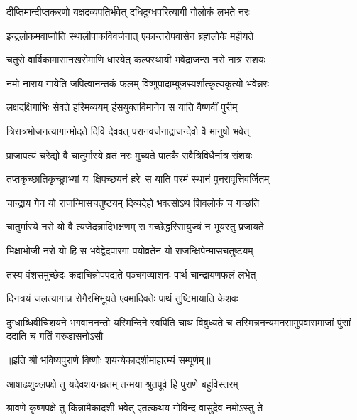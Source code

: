\twolineshloka
{दीप्तिमान्दीप्तकरणो यक्षद्रव्यपतिर्भवेत्}
{दधिदुग्धपरित्यागी गोलोकं लभते नरः} %

\twolineshloka
{इन्द्रलोकमवाप्नोति स्थालीपाकविवर्जनात्}
{एकान्तरोपवासेन ब्रह्मलोके महीयते} %

\twolineshloka
{चतुरो वार्षिकामासानखरोमाणि धारयेत्}
{कल्पस्थायी भवेद्राजन्स नरो नात्र संशयः} %

\twolineshloka
{नमो नाराय गायेति जपित्वानन्तकं फलम्}
{विष्णुपादाम्बुजस्पर्शात्कृत्यकृत्यो भवेन्नरः} %

\twolineshloka
{लक्षदक्षिगाभिः सेवते हरिमव्ययम्}
{हंसयुक्तविमानेन स याति वैष्णवीं पुरीम्} %

\twolineshloka
{त्रिरात्रभोजनत्यागान्मोदते दिवि देववत्}
{परानवर्जनाद्राजन्देवो वै मानुषो भवेत्} %

\twolineshloka
{प्राजापत्यं चरेद्यो वै चातुर्मास्ये व्रतं नरः}
{मुच्यते पातकै सवैत्रिविधैर्नात्र संशयः} %

\twolineshloka
{तप्तकृच्छातिकृच्छ्राभ्यां यः क्षिपच्छयनं हरेः}
{स याति परमं स्थानं पुनरावृत्तिवर्जितम्} %

\twolineshloka
{चान्द्राय गेन यो राजन्मिासचतुष्टयम्}
{दिव्यदेहो भवत्सोऽथ शिवलोकं च गच्छति} %

\twolineshloka
{चातुर्मास्ये नरो यो वै त्यजेदन्नादिभक्षणम्}
{स गच्छेद्धरिसायुज्यं न भूयस्तु प्रजायते} %

\twolineshloka
{भिक्षाभोजी नरो यो हि स भवेद्वेदपारगा}
{पयोव्रतेन यो राजन्क्षिपेन्मासचतुष्टयम्} %

\twolineshloka
{तस्य वंशसमुच्छेदः कदाचिन्नोपपद्यते}
{पञ्चगव्याशनः पार्थ चान्द्रायणफलं लभेत्} %

\twolineshloka
{दिनत्रयं जलत्यागान्न रोगैरभिभूयते}
{एवमादिवतेः पार्थ तुष्टिमायाति केशवः} %

\twolineshloka
{दुग्धाब्धिवीचिशयने भगवाननन्तो यस्मिन्दिने स्वपिति चाथ विबुध्यते च}
{तस्मिन्ननन्यमनसामुपवासमाजां पुंसां ददाति च गतिं गरुडासनोऽसौ} %

॥इति श्री भविष्यपुराणे विष्णोः शयन्येकादशीमाहात्म्यं सम्पूर्णम्॥



\twolineshloka
{आषाढशुक्लपक्षे तु यदेवशयनव्रतम्}
{तन्मया श्रुतपूर्व हि पुराणे बहुविस्तरम्} %

\twolineshloka
{श्रावणे कृष्णपक्षे तु किन्नामैकादशी भवेत्}
{एतत्कथय गोविन्द वासुदेव नमोऽस्तु ते} %


